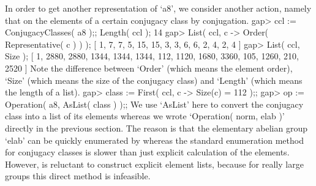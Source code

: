 In  order to get  another  representation  of  `a8', we consider  another
action, namely  that on  the elements   of a  certain conjugacy  class by
conjugation.
\beginexample
    gap> ccl := ConjugacyClasses( a8 );; Length( ccl );
    14
    gap> List( ccl, c -> Order( Representative( c ) ) );
    [ 1, 7, 7, 5, 15, 15, 3, 3, 6, 6, 2, 4, 2, 4 ]
    gap> List( ccl, Size );
    [ 1, 2880, 2880, 1344, 1344, 1344, 112, 1120, 1680, 3360, 105, 1260, 210, 
      2520 ]
\endexample
Note the  difference between  `Order'  (which means  the element  order),
`Size' (which means the size of the conjugacy  class) and `Length' (which
means the length of a  list).
\beginexample
    gap> class := First( ccl, c -> Size(c) = 112 );;
    gap> op := Operation( a8, AsList( class ) );;
\endexample
We use `AsList' here  to convert the conjugacy class  into a list  of its
elements whereas we   wrote  `Operation( norm,  elab )'   directly in the
previous section. The reason is that  the elementary abelian group `elab'
can  be quickly enumerated by   {\GAP}  whereas the standard  enumeration
method for conjugacy classes is  slower than just explicit calculation of
the elements. However, {\GAP} is reluctant  to construct explicit element
lists, because for really large groups this direct method is infeasible.

